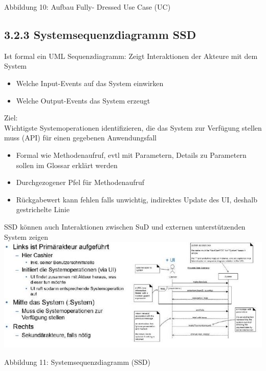 Abbildung 10: Aufbau Fully- Dressed Use Case (UC)

\subsection*{3.2.3 Systemsequenzdiagramm SSD}
Ist formal ein UML Sequenzdiagramm: Zeigt Interaktionen der Akteure mit dem System

\begin{itemize}
  \item Welche Input-Events auf das System einwirken
  \item Welche Output-Events das System erzeugt
\end{itemize}

Ziel:\\
Wichtigste Systemoperationen identifizieren, die das System zur Verfügung stellen muss (API) für einen gegebenen Anwendungsfall

\begin{itemize}
  \item Formal wie Methodenaufruf, evtl mit Parametern, Details zu Parametern sollen im Glossar erklärt werden
  \item Durchgezogener Pfel für Methodenaufruf
  \item Rückgabewert kann fehlen falls unwichtig, indirektes Update des UI, deshalb gestrichelte Linie
\end{itemize}

SSD können auch Interaktionen zwischen SuD und externen unterstützenden System zeigen\\
\includegraphics[width=\linewidth]{images/2024_12_29_0d1d7b5551ea1b4b41bdg-06}

Abbildung 11: Systemsequenzdiagramm (SSD)